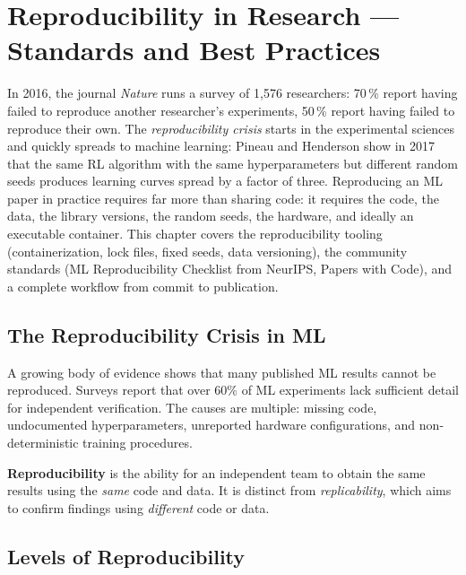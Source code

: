 \chapter{Reproducibility in Research --- Standards and Best Practices}
\label{ch:reproducibility}

In 2016, the journal \emph{Nature} runs a survey of 1{,}576 researchers: 70\,\% report having failed to reproduce another researcher's experiments, 50\,\% report having failed to reproduce their own. The \emph{reproducibility crisis} starts in the experimental sciences and quickly spreads to machine learning: Pineau and Henderson show in 2017 that the same RL algorithm with the same hyperparameters but different random seeds produces learning curves spread by a factor of three. Reproducing an ML paper in practice requires far more than sharing code: it requires the code, the data, the library versions, the random seeds, the hardware, and ideally an executable container. This chapter covers the reproducibility tooling (containerization, lock files, fixed seeds, data versioning), the community standards (ML Reproducibility Checklist from NeurIPS, Papers with Code), and a complete workflow from commit to publication.

\section{The Reproducibility Crisis in ML}
\label{sec:repro-crisis}

A growing body of evidence shows that many published ML results cannot
be reproduced. Surveys report that over 60\% of ML experiments lack
sufficient detail for independent verification. The causes are
multiple: missing code, undocumented hyperparameters, unreported
hardware configurations, and non-deterministic training procedures.

\begin{definition}[Reproducibility]
\textbf{Reproducibility} is the
ability for an independent team to obtain the same results using the
\emph{same} code and data. It is distinct from \emph{replicability},
which aims to confirm findings using \emph{different} code or data.
\end{definition}

\section{Levels of Reproducibility}
\label{sec:repro-levels}

